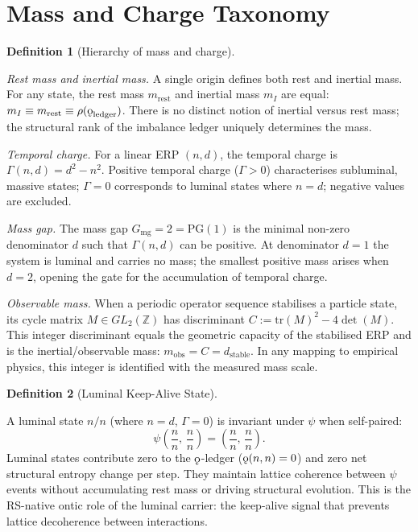 \documentclass[11pt, letterpaper]{article}
\newcommand{\Z}{\mathbb{Z}}
\newcommand{\rank}{\rho}
\newcommand{\koppa}{\mathbin{\text{\rm\k{o}}}}
\newcommand{\Tcharge}{\Gamma}
\newcommand{\PG}{\mathrm{PG}}
\theoremstyle{definition}
\newtheorem{definition}{Definition}[section]
\theoremstyle{plain}
\begin{document}
\newpage


\section{Mass and Charge Taxonomy}\label{sec:mass-taxonomy}

\begin{definition}[Hierarchy of mass and charge]\label{def:mass-hierarchy}
\begin{rsbox}
\emph{Rest mass and inertial mass.}  A single origin defines both rest and
inertial mass.  For any state, the rest mass $m_{\mathrm{rest}}$ and inertial
mass $m_I$ are equal: $m_I\equiv m_{\mathrm{rest}}\equiv
\rank(\koppa_{\mathrm{ledger}})$.  There is no distinct notion of inertial
versus rest mass; the structural rank of the imbalance ledger uniquely
determines the mass.

\emph{Temporal charge.}  For a linear ERP $(n,d)$, the temporal charge is
$\Tcharge(n,d)=d^2-n^2$.  Positive temporal charge ($\Tcharge>0$)
characterises subluminal, massive states; $\Tcharge=0$ corresponds to luminal
states where $n=d$; negative values are excluded.

\emph{Mass gap.}  The mass gap $G_{\mathrm{mg}}=2=\PG(1)$ is the minimal
non-zero denominator $d$ such that $\Tcharge(n,d)$ can be positive.  At
denominator $d=1$ the system is luminal and carries no mass; the smallest
positive mass arises when $d=2$, opening the gate for the accumulation of
temporal charge.

\emph{Observable mass.}  When a periodic operator sequence stabilises a
particle state, its cycle matrix $M\in GL_2(\Z)$ has discriminant
$C:=\mathrm{tr}(M)^2-4\det(M)$.  This integer discriminant equals the
geometric capacity of the stabilised ERP and is the inertial/observable mass:
$m_{\mathrm{obs}}=C=d_{\mathrm{stable}}$.  In any mapping to empirical
physics, this integer is identified with the measured mass scale.
\end{rsbox}
\end{definition}

\begin{definition}[Luminal Keep-Alive State]\label{def:photon-keepalive}
\begin{rsbox}
A luminal state $n/n$ (where $n=d$, $\Tcharge=0$) is invariant under $\psi$
when self-paired:
\[
\psi\!\left(\frac{n}{n},\,\frac{n}{n}\right) = \left(\frac{n}{n},\,\frac{n}{n}\right).
\]
Luminal states contribute zero to the $\koppa$-ledger ($\koppa(n,n)=0$) and
zero net structural entropy change per step.  They maintain lattice coherence
between $\psi$ events without accumulating rest mass or driving structural
evolution.  This is the RS-native ontic role of the luminal carrier: the
keep-alive signal that prevents lattice decoherence between interactions.
\end{rsbox}
\end{definition}
\end{document}
